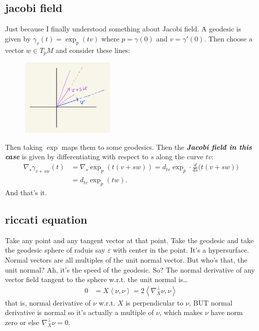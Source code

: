 \subsection{jacobi field}

Just because I finally understood something about Jacobi field. A geodesic is given by \(\gamma_v(t)=\operatorname{exp}_p(tv)\) where \(p=\gamma(0)\) and \(v=\gamma'(0)\). Then choose a vector \(w \in T_pM\) and consider these lines:
\begin{figure}[H]
	\centering
	\includegraphics[width=0.4\textwidth]{fig2}
\end{figure}
Then taking \(\operatorname{exp}\) maps them to some geodesics. Then the \textit{\textbf{Jacobi field in this case}} is given by differentiating with respect to \(s\) along the curve \(tv\):
\begin{align*}\nabla_s \gamma_{v+sw}(t)&=\nabla_s \operatorname{exp}_p(t(v+sw))=d_{tv}\operatorname{exp}_p\cdot \frac{d}{ds}\Big(t(v+sw)\Big)\\&=d_{tv}\operatorname{exp}_p(tw).\end{align*}
And that's it.

\subsection{riccati equation}

Take any point and any tangent vector at that point. Take the geodesic and take the geodesic sphere of raduis say \(\varepsilon\) with center in the point. It's a hypersurface. Normal vectors are all multiples of the unit normal vector. But who's that, the unit normal? Ah, it's the speed of the geodesic. So? The normal derivative of any vector field tangent to the sphere w.r.t. the unit normal is…
\begin{align*}
0&=X\left<\nu,\nu\right>=2\left<\nabla^\perp_X \nu,\nu\right>
\end{align*}
that is, normal derivative of \(\nu\) w.r.t. \(X\) is perpendicular to \(\nu\), BUT normal derivative is normal so it's actually a multiple of \(\nu\), which makes \(\nu\) have norm zero or else \(\nabla^\perp_X \nu=0\).

